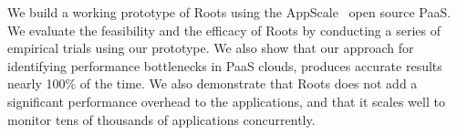 We build a working prototype of 
Roots using the AppScale~\cite{6488671} open source PaaS. We evaluate the feasibility and the 
efficacy of Roots by conducting a series of empirical trials using our prototype. 
We also show that our approach for identifying performance bottlenecks
in PaaS clouds, produces accurate results nearly 100\% of the time. 
We also demonstrate that Roots does not add a significant performance overhead
to the applications, and that it scales well to monitor tens of thousands
of applications concurrently.


